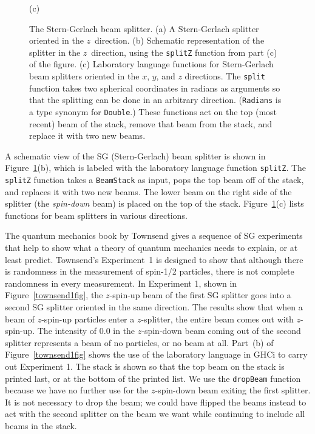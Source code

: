 \documentclass{eptcs}
\newcommand{\DataTypeTok}[1]{\textcolor[rgb]{0.56,0.13,0.00}{{#1}}}
\newcommand{\FunctionTok}[1]{\textcolor[rgb]{0.02,0.16,0.49}{{#1}}}
\begin{document}
\begin{figure}
\begin{center}
(c)
  \end{center}
\caption{The Stern-Gerlach beam splitter.
  (a) A Stern-Gerlach splitter oriented in the $z$~direction.
  (b) Schematic representation of the splitter in the $z$~direction,
   using the \FunctionTok{\texttt{splitZ}} function from part (c)
   of the figure.
  (c) Laboratory language functions for Stern-Gerlach
  beam splitters oriented in the $x$, $y$, and $z$ directions.
  The \FunctionTok{\texttt{split}} function takes two spherical coordinates
  in radians as
  arguments so that the splitting can be done in an arbitrary direction.
  (\DataTypeTok{\texttt{Radians}} is a type synonym for \DataTypeTok{\texttt{Double}}.)
  These functions act on the top (most recent) beam of the stack, remove that
  beam from the stack, and replace it with two new beams.}
\label{sgsplitter}
\end{figure}

A schematic view of the SG (Stern-Gerlach) beam splitter is shown in
Figure~\ref{sgsplitter}(b), which is labeled with the laboratory language
function \FunctionTok{\texttt{splitZ}}.  The \FunctionTok{\texttt{splitZ}}
function takes a \DataTypeTok{\texttt{BeamStack}} as input, pops the top
beam off of the stack, and replaces it with two new beams.  The lower beam
on the right side of the splitter (the \emph{spin-down} beam)
is placed on the top of the stack.  Figure~\ref{sgsplitter}(c) lists
functions for beam splitters in various directions.

The quantum mechanics book by Townsend\cite{townsend} gives a sequence
of SG experiments that help to show what a theory of quantum mechanics
needs to explain, or at least predict.  Townsend's Experiment~1
is designed to show that although there is randomness in the measurement
of spin-1/2 particles, there is not complete randomness in every measurement.
In Experiment 1, shown in Figure~\ref{townsend1fig},
the $z$-spin-up beam of the first SG splitter goes into a second SG splitter
oriented in the same direction.
The results show that when a beam of $z$-spin-up particles
enter a $z$-splitter, the entire beam comes out with $z$-spin-up.
The intensity of $0.0$ in the $z$-spin-down beam coming out of the second
splitter represents a beam of no particles, or no beam at all.
Part~(b) of Figure~\ref{townsend1fig} shows the use of the laboratory
language in GHCi to carry out Experiment 1.  The stack is shown so that
the top beam on the stack is printed last, or at the bottom of the printed
list.  We use the \FunctionTok{\texttt{dropBeam}} function
because we have no further use for the $z$-spin-down beam exiting
the first splitter.  It is not necessary to drop the beam; we could
have flipped the beams instead to act with the second splitter
on the beam we want while continuing to include all beams in the stack.
\end{document}

